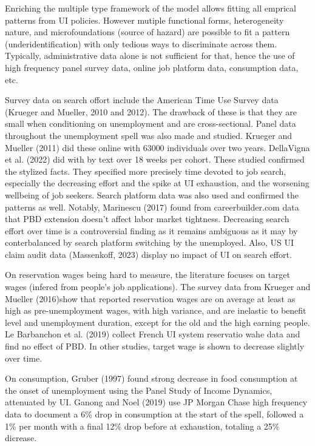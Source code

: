 \documentclass{article}
\begin{document}
Enriching the multiple type framework of the model allows fitting all emprical patterns from UI policies. However mutiple functional forms, heterogeneity nature, and microfoundations (source of hazard) are possible to fit a pattern (underidentification) with only tedious ways to discriminate across them. Typically, administrative data alone is not sufficient for that, hence the use of high frequency panel survey data, online job platform data, consumption data, etc.

Survey data on search offort include the American Time Use Survey data (Krueger and Mueller, 2010 and 2012). The drawback of these is that they are small when conditioning on unemployment and are cross-sectional. Panel data throughout the unemployment spell was also made and studied. Krueger and Mueller (2011) did these online with 63000 individuals over two years. DellaVigna et al. (2022) did with by text over 18 weeks per cohort. These studied confirmed the stylized facts. They specified more precisely time devoted to job search, especially the decreasing effort and the spike at UI exhaustion, and the worsening wellbeing of job seekers. Search platform data was also used and confirmed the patterns as well. Notably, Marinescu (2017) found from careerbuilder.com data that PBD extension doesn't affect labor market tightness. Decreasing search effort over time is a controversial finding as it remains ambiguous as it may by conterbalanced by search platform switching by the unemployed. Also, US UI claim audit data (Massenkoff, 2023) display no impact of UI on search effort.

On reservation wages being hard to measure, the literature focuses on target wages (infered from people's job applications). The survey data from Krueger and Mueller (2016)show that reported reservation wages are on average at least as high as pre-unemployment wages, with high variance, and are inelastic to benefit level and unemployment duration, except for the old and the high earning people. Le Barbanchon et al. (2019) collect French UI system reservatio wahe data and find no effect of PBD. In other studies, target wage is shown to decrease slightly over time.

On consumption, Gruber (1997) found strong decrease in food consumption at the onset of unemployment using the Panel Study of Income Dynamics, attenuated by UI. Ganong and Noel (2019) use JP Morgan Chase high frequency data to document a 6\% drop in consumption at the start of the spell, followed a 1\% per month with a final 12\% drop before at exhaustion, totaling a 25\% dicrease.
\end{document}
